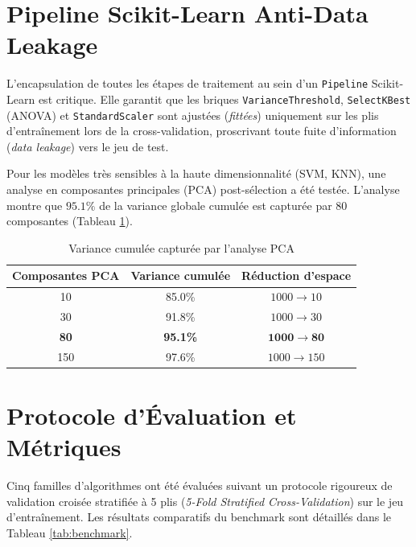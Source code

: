 \documentclass[12pt,a4paper]{report}
\begin{document}
\section{Pipeline Scikit-Learn Anti-Data Leakage}
L'encapsulation de toutes les étapes de traitement au sein d'un \texttt{Pipeline} Scikit-Learn est critique. Elle garantit que les briques \texttt{VarianceThreshold}, \texttt{SelectKBest} (ANOVA) et \texttt{StandardScaler} sont ajust\'ees (\textit{fitt\'ees}) uniquement sur les plis d'entra\^inement lors de la cross-validation, proscrivant toute fuite d'information (\textit{data leakage}) vers le jeu de test.

Pour les mod\`eles tr\`es sensibles \`a la haute dimensionnalit\'e (SVM, KNN), une analyse en composantes principales (PCA) post-s\'election a \'et\'e test\'ee. L'analyse montre que $95.1\%$ de la variance globale cumul\'ee est captur\'ee par 80 composantes (Tableau \ref{tab:pca_variance}).

\begin{table}[H]
\centering
\caption{Variance cumul\'ee captur\'ee par l'analyse PCA}
\label{tab:pca_variance}
\begin{tabular}{ccc}
\toprule
\textbf{Composantes PCA} & \textbf{Variance cumul\'ee} & \textbf{R\'eduction d'espace} \\
\midrule
10 & 85.0\% & $1000 \rightarrow 10$ \\
30 & 91.8\% & $1000 \rightarrow 30$ \\
\rowcolor{infobg}\textbf{80} & \textbf{95.1\%} & $\mathbf{1000 \rightarrow 80}$ \\
150 & 97.6\% & $1000 \rightarrow 150$ \\
\bottomrule
\end{tabular}
\end{table}

\section{Protocole d'\'Evaluation et M\'etriques}
Cinq familles d'algorithmes ont \'et\'e \'evalu\'ees suivant un protocole rigoureux de validation crois\'ee stratifi\'ee \`a 5 plis (\textit{5-Fold Stratified Cross-Validation}) sur le jeu d'entra\^inement. Les r\'esultats comparatifs du benchmark sont d\'etaill\'es dans le Tableau \ref{tab:benchmark}.
\end{document}
